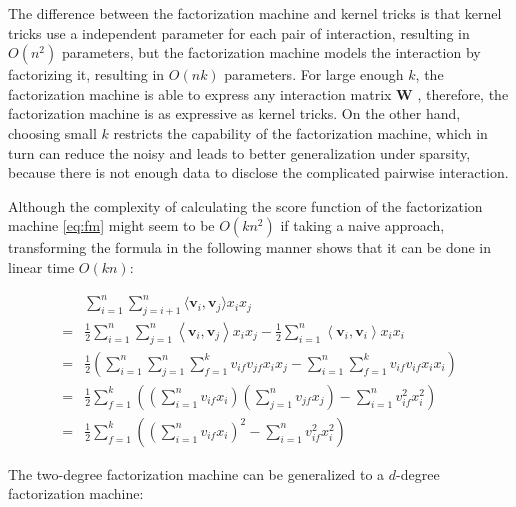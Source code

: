         The difference between the factorization machine and kernel tricks is that
        kernel tricks use a independent parameter for each pair of interaction, resulting in $O(n^2)$ parameters,
        but the factorization machine models the interaction by factorizing it, resulting in $O(nk)$ parameters.
        For large enough $k$, the factorization machine is able to express any interaction matrix $\bm{W}$ \cite{Rendle2010},
        therefore, the factorization machine is as expressive as kernel tricks.
        On the other hand, choosing small $k$ restricts the capability of the factorization machine,
        which in turn can reduce the noisy and leads to better generalization under sparsity,
        because there is not enough data to disclose the complicated pairwise interaction.

        Although the complexity of calculating the score function of the factorization machine \ref{eq:fm}
        might seem to be $O(kn^2)$ if taking a naive approach,
        transforming the formula in the following manner shows that it can be done in linear time $O(kn)$:

        \begin{align*}
        & \sum_{i=1}^n\sum_{j=i+1}^n \langle \bm{v}_i, \bm{v}_j \rangle x_ix_j \\
        =& \frac { 1} { 2} \sum _ { i = 1} ^ { n } \sum _ { j = 1} ^ { n } \left\langle \bm { v } _ { i } ,\bm { v } _ { j } \right\rangle x _ { i } x _ { j } - \frac { 1} { 2} \sum _ { i = 1} ^ { n } \left\langle \bm { v } _ { i } ,\bm { v } _ { i } \right\rangle x _ { i } x _ { i } \\
        =& \frac { 1} { 2} \left( \sum _ { i = 1} ^ { n } \sum _ { j = 1} ^ { n } \sum _ { f = 1} ^ { k } v _ { if } v _ { jf} x _ { i } x _ { j } - \sum _ { i = 1} ^ { n } \sum _ { f = 1} ^ { k } v _ { if } v _ { if } x _ { i } x _ { i } \right) \\
        =& \frac { 1} { 2} \sum _ { f = 1} ^ { k } \left( \left( \sum _ { i = 1} ^ { n } v _ { if } x _ { i } \right) \left( \sum _ { j = 1} ^ { n } v _ { jf } x _ { j } \right) - \sum _ { i = 1} ^ { n } v _ { if } ^ { 2} x _ { i } ^ { 2} \right) \\
        =& \frac { 1} { 2} \sum _ { f = 1} ^ { k } \left( \left( \sum _ { i = 1} ^ { n } v _ { if } x _ { i } \right) ^ { 2} - \sum _ { i = 1} ^ { n } v _ { if } ^ { 2} x _ { i } ^ { 2} \right)
        \end{align*}

        The two-degree factorization machine can be generalized to a $d$-degree factorization machine:

